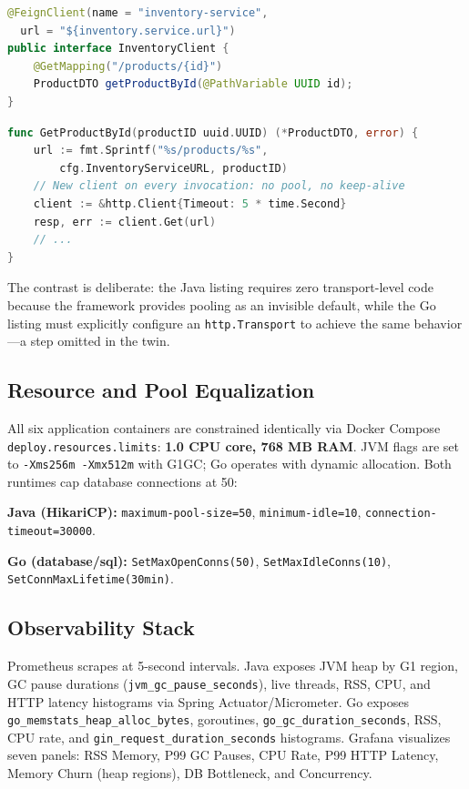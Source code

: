 \documentclass[conference]{IEEEtran}
\begin{document}
\begin{lstlisting}[language=Java, caption={Java OpenFeign client---connection pooling is implicit}, label={lst:feign}]
@FeignClient(name = "inventory-service",
  url = "${inventory.service.url}")
public interface InventoryClient {
    @GetMapping("/products/{id}")
    ProductDTO getProductById(@PathVariable UUID id);
}
\end{lstlisting}

\begin{lstlisting}[language=Go, caption={Go HTTP client---a new client per call, no reuse}, label={lst:goclient}]
func GetProductById(productID uuid.UUID) (*ProductDTO, error) {
    url := fmt.Sprintf("%s/products/%s",
        cfg.InventoryServiceURL, productID)
    // New client on every invocation: no pool, no keep-alive
    client := &http.Client{Timeout: 5 * time.Second}
    resp, err := client.Get(url)
    // ...
}
\end{lstlisting}

The contrast is deliberate: the Java listing requires zero transport-level code because the framework provides pooling as an invisible default, while the Go listing must explicitly configure an \texttt{http.Transport} to achieve the same behavior---a step omitted in the twin.

\subsection{Resource and Pool Equalization}

All six application containers are constrained identically via Docker Compose \texttt{deploy.resources.limits}: \textbf{1.0 CPU core, 768 MB RAM}. JVM flags are set to \texttt{-Xms256m -Xmx512m} with G1GC; Go operates with dynamic allocation. Both runtimes cap database connections at 50:

\textbf{Java (HikariCP):} \texttt{maximum-pool-size=50}, \texttt{minimum-idle=10}, \texttt{connection-timeout=30000}.

\textbf{Go (database/sql):} \texttt{SetMaxOpenConns(50)}, \texttt{SetMaxIdleConns(10)}, \texttt{SetConnMaxLifetime(30min)}.

\subsection{Observability Stack}

Prometheus scrapes at 5-second intervals. Java exposes JVM heap by G1 region, GC pause durations (\texttt{jvm\_gc\_pause\_seconds}), live threads, RSS, CPU, and HTTP latency histograms via Spring Actuator/Micrometer. Go exposes \texttt{go\_memstats\_heap\_alloc\_bytes}, goroutines, \texttt{go\_gc\_duration\_seconds}, RSS, CPU rate, and \texttt{gin\_request\_duration\_seconds} histograms. Grafana visualizes seven panels: RSS Memory, P99 GC Pauses, CPU Rate, P99 HTTP Latency, Memory Churn (heap regions), DB Bottleneck, and Concurrency.
\end{document}
